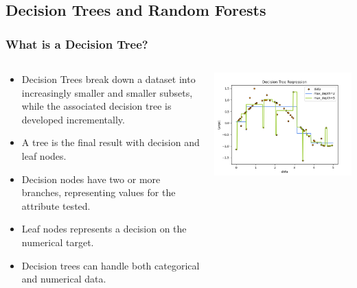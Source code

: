 \documentclass{beamer}
\begin{document}
	\subsection{Decision Trees and Random Forests}
	\begin{frame}
		\frametitle{What is a Decision Tree?}
\begin{columns}
	\begin{footnotesize}
		\begin{itemize}
			\item Decision Trees break down a dataset into increasingly smaller and smaller subsets, while the associated decision tree is developed incrementally. 
			\item A tree is the final result with decision and leaf nodes.  
			\item Decision nodes have two or more branches, representing values for the attribute tested. 
			\item Leaf nodes represents a decision on the numerical target.   
			\item Decision trees can handle both categorical and numerical data.
		\end{itemize}
		
	\end{footnotesize}
	\includegraphics[width=1.\textwidth]{images/decision tree regression.png}
	
\end{columns}
	\end{frame}
	
\end{document}
